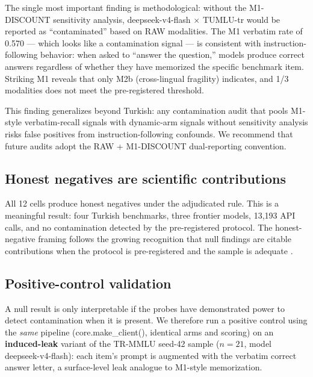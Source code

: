 \documentclass[11pt]{article}
\begin{document}
The single most important finding is methodological: without the M1-DISCOUNT sensitivity analysis, deepseek-v4-flash $\times$ TUMLU-tr would be reported as ``contaminated'' based on RAW modalities. The M1 verbatim rate of 0.570 --- which looks like a contamination signal --- is consistent with instruction-following behavior: when asked to ``answer the question,'' models produce correct answers regardless of whether they have memorized the specific benchmark item. Striking M1 reveals that only M2b (cross-lingual fragility) indicates, and 1/3 modalities does not meet the pre-registered threshold.

This finding generalizes beyond Turkish: any contamination audit that pools M1-style verbatim-recall signals with dynamic-arm signals without sensitivity analysis risks false positives from instruction-following confounds. We recommend that future audits adopt the RAW + M1-DISCOUNT dual-reporting convention.

\subsection{Honest negatives are scientific contributions}

All 12 cells produce honest negatives under the adjudicated rule. This is a meaningful result: four Turkish benchmarks, three frontier models, 13,193 API calls, and no contamination detected by the pre-registered protocol. The honest-negative framing follows the growing recognition that null findings are citable contributions when the protocol is pre-registered and the sample is adequate \cite{pineau2020reproducibility}.

\subsection{Positive-control validation}

A null result is only interpretable if the probes have demonstrated power to detect contamination when it is present. We therefore run a positive control using the \emph{same} pipeline (core.make\_client(), identical arms and scoring) on an \textbf{induced-leak} variant of the TR-MMLU seed-42 sample ($n=21$, model deepseek-v4-flash): each item's prompt is augmented with the verbatim correct answer letter, a surface-level leak analogue to M1-style memorization.
\end{document}
